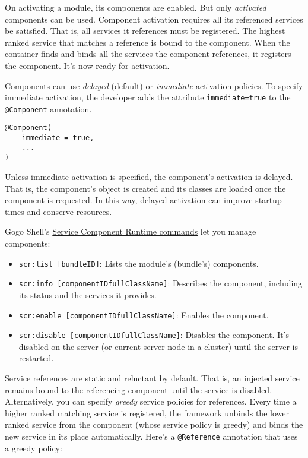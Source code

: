 On activating a module, its components are enabled. But only
\emph{activated} components can be used. Component activation requires
all its referenced services be satisfied. That is, all services it
references must be registered. The highest ranked service that matches a
reference is bound to the component. When the container finds and binds
all the services the component references, it registers the component.
It's now ready for activation.

Components can use \emph{delayed} (default) or \emph{immediate}
activation policies. To specify immediate activation, the developer adds
the attribute \texttt{immediate=true} to the \texttt{@Component}
annotation.

\begin{verbatim}
@Component(
    immediate = true,
    ...
)
\end{verbatim}

Unless immediate activation is specified, the component's activation is
delayed. That is, the component's object is created and its classes are
loaded once the component is requested. In this way, delayed activation
can improve startup times and conserve resources.

Gogo Shell's
\href{http://felix.apache.org/documentation/subprojects/apache-felix-service-component-runtime.html\#shell-command}{Service
Component Runtime commands} let you manage components:

\begin{itemize}
\item
  \texttt{scr:list\ {[}bundleID{]}}: Lists the module's (bundle's)
  components.
\item
  \texttt{scr:info\ {[}componentID\textbar{}fullClassName{]}}: Describes
  the component, including its status and the services it provides.
\item
  \texttt{scr:enable\ {[}componentID\textbar{}fullClassName{]}}: Enables
  the component.
\item
  \texttt{scr:disable\ {[}componentID\textbar{}fullClassName{]}}:
  Disables the component. It's disabled on the server (or current server
  node in a cluster) until the server is restarted.
\end{itemize}

Service references are static and reluctant by default. That is, an
injected service remains bound to the referencing component until the
service is disabled. Alternatively, you can specify \emph{greedy}
service policies for references. Every time a higher ranked matching
service is registered, the framework unbinds the lower ranked service
from the component (whose service policy is greedy) and binds the new
service in its place automatically. Here's a \texttt{@Reference}
annotation that uses a greedy policy:

